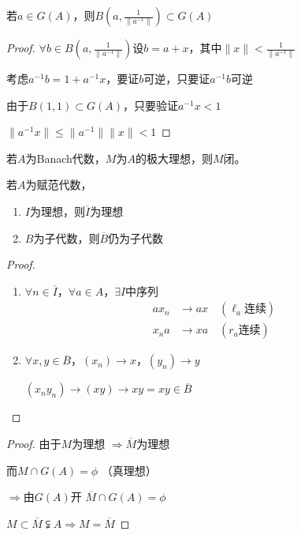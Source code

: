 \documentclass[lang=cn,a4paper,newtx,section]{elegantbook}
\begin{document}
\begin{proposition}
  若$a \in G(A)$，则$B(a, \frac{1}{\|a^{-1}\|}) \subset G(A)$
\end{proposition}

\begin{proof}
  $\forall b \in B(a, \frac{1}{\|a^{-1}\|})$设$b = a + x$，其中$\|x\| < \frac{1}{\|a^{-1}\|}$
  
  考虑$a^{-1}b = 1 + a^{-1}x$，要证$b$可逆，只要证$a^{-1}b$可逆
  
  由于$ B(1, 1) \subset G(A)$，只要验证$a^{-1}x < 1$
  
  $\|a^{-1}x\| \leq \|a^{-1}\| \|x\| < 1$
\end{proof}

\begin{proposition}
  若$A$为Banach代数，$M$为$A$的极大理想，则$M$闭。
\end{proposition}

\begin{proposition}
  若$A$为赋范代数，
  \begin{enumerate}
    \item $I$为理想，则$\overline{I}$为理想
    \item $B$为子代数，则$\overline{B}$仍为子代数
  \end{enumerate}
\end{proposition}

\begin{proof}
  \begin{enumerate}
    \item $\forall n \in \overline{I}$，$\forall a \in A$，$\exists I$中序列
    \begin{equation*}
      \begin{aligned}
        ax_n &\longrightarrow ax \quad (\ell_a\text{连续}) \\
        x_n a &\longrightarrow xa \quad (r_a\text{连续})
      \end{aligned}
    \end{equation*}
    
    \item $\forall x, y \in \overline{B}$，$(x_n) \to x$，$(y_n) \to y$
    
    $(x_n y_n) \to (xy) \to xy = xy \in \overline{B}$
  \end{enumerate}
\end{proof}

\begin{proof}
  由于$ M$为理想 $\Rightarrow \overline{M}$为理想
  
  而$M \cap G(A) = \phi$ （真理想）
  
  $\Rightarrow \text{由} G(A)$开 \quad$\overline{M} \cap G(A) = \phi$
  
  $ M \subset \overline{M} \subsetneqq  A \Rightarrow M = \overline{M}$
\end{proof}
\end{document}
